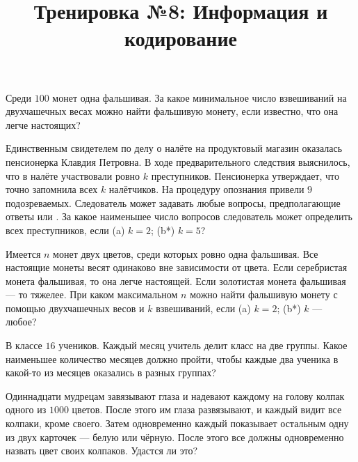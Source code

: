 



\title{Тренировка №8: Информация и кодирование}
\maketitle

\begin{problem}
	Среди $100$ монет одна фальшивая. За какое минимальное число взвешиваний на двухчашечных весах можно найти фальшивую монету, если известно, что она легче настоящих?
\end{problem}

\begin{problem}
	Единственным свидетелем по делу о налёте на продуктовый магазин \guillemotright оказалась пенсионерка Клавдия Петровна. В ходе предварительного следствия выяснилось, что в налёте участвовали ровно $k$ преступников. Пенсионерка утверждает, что точно запомнила всех $k$ налётчиков. На процедуру опознания привели $9$ подозреваемых. Следователь может задавать любые вопросы, предполагающие ответы \guillemotright или \guillemotright. За какое наименьшее число вопросов следователь может определить всех преступников, если (a) $k = 2$; (b*) $k = 5$?
\end{problem}

\begin{problem}
	Имеется $n$ монет двух цветов, среди которых ровно одна фальшивая. Все настоящие монеты весят одинаково вне зависимости от цвета. Если серебристая монета фальшивая, то она легче настоящей. Если золотистая монета фальшивая --- то тяжелее. При каком максимальном $n$ можно найти фальшивую монету с помощью двухчашечных весов и $k$ взвешиваний, если (a) $k = 2$; (b*) $k$ --- любое?
\end{problem}

\begin{problem}
	В классе $16$ учеников. Каждый месяц учитель делит класс на две группы. Какое наименьшее количество месяцев должно пройти, чтобы каждые два ученика в какой-то из месяцев оказались в разных группах?
\end{problem}

\begin{problem}
	Одиннадцати мудрецам завязывают глаза и надевают каждому на голову колпак одного из $1000$ цветов. После этого им глаза развязывают, и каждый видит все колпаки, кроме своего. Затем одновременно каждый показывает остальным одну из двух карточек --- белую или чёрную. После  этого все должны одновременно назвать цвет своих колпаков. Удастся ли это?
\end{problem}

